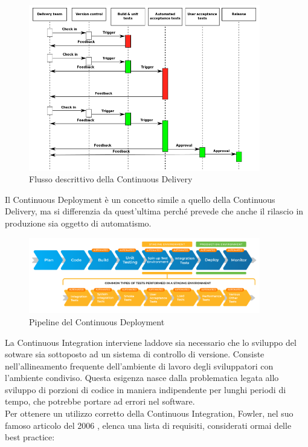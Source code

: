 \documentclass[a4paper, 12pt]{report}
\numberwithin{equation}{section}
\begin{document}
\begin{figure}
    \centering
    \includegraphics[width=0.9\textwidth]{imgs/cd-funzionale.png}
    \caption{Flusso descrittivo della Continuous Delivery}
    \label{fig:cd-flux}
\end{figure}
Il Continuous Deployment è un concetto simile a quello della Continuous Delivery, ma si differenzia da quest’ultima perché prevede che anche il rilascio in produzione sia oggetto di automatismo.
\begin{figure}[H]
    \centering
    \includegraphics[width=0.9\textwidth]{imgs/continuous-deployment.png}
    \caption{Pipeline del Continuous Deployment}
    \label{fig:my_label}
\end{figure}
La Continuous Integration interviene laddove sia necessario che lo sviluppo del sotware sia sottoposto ad un sistema di controllo di versione. Consiste nell’allineamento frequente dell'ambiente di lavoro degli sviluppatori con l’ambiente condiviso. Questa esigenza nasce dalla problematica legata allo sviluppo di porzioni di codice in maniera indipendente per lunghi periodi di tempo, che potrebbe portare ad errori nel software.\\
Per ottenere un utilizzo corretto della Continuous Integration, Fowler, nel suo famoso articolo del 2006 \cite{fowler-ci}, elenca una lista di requisiti, considerati ormai delle best practice:
\end{document}
